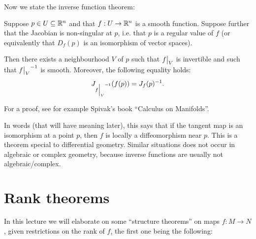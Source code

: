 \documentclass[11pt, english]{article}
\begin{document}
Now we state the inverse function theorem:
\begin{thm}
Suppose $p \in U \subseteq \mathbb{R}^n$ and that $f:U \to \mathbb{R}^n$ is a smooth function. Suppose further that the Jacobian is non-singular at $p$, i.e. that $p$ is a regular value of $f$ (or equivalently that $D_f(p)$ is an isomorphism of vector spaces).

Then there exists a neighbourhood $V$ of $p$ such that $\restr fV$ is invertible and such that $\restr fV^{-1}$ is smooth. Moreover, the following equality holds:
\[
J_{\restr fV^{-1}}(f(p)) = J_f(p)^{-1}.
\]
\end{thm}

For a proof, see for example Spivak's book ``Calculus on Manifolds''.

In words (that will have meaning later), this says that if the tangent map is an isomorphism at a point $p$, then $f$ is locally a diffeomorphism near $p$. This is a theorem special to differential geometry. Similar situations does not occur in algebraic or complex geometry, because inverse functions are usually not algebraic/complex.


\pagebreak
\section{Rank theorems}

In this lecture we will elaborate on some ``structure theorems'' on maps $f\colon M \to N$, given restrictions on the rank of $f$, the first one being the following:
\end{document}
